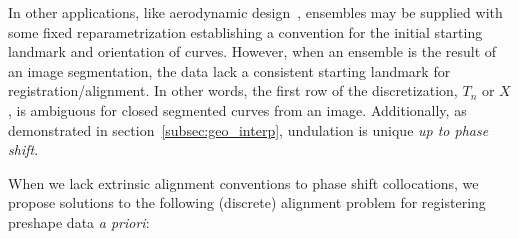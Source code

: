 \documentclass[pdflatex,iicol]{sn-jnl}%
\theoremstyle{thmstyleone}%
\theoremstyle{thmstyletwo}%
\theoremstyle{thmstylethree}%
\begin{document}
In other applications, like aerodynamic design~\cite{grey2023separable}, ensembles may be supplied with some fixed reparametrization establishing a convention for the initial starting landmark and orientation of curves. However, when an ensemble is the result of an image segmentation, the data lack a consistent starting landmark for registration/alignment. In other words, the first row of the discretization, $T_n$ or $X$, is ambiguous for closed segmented curves from an image. Additionally, as demonstrated in section~\ref{subsec:geo_interp}, undulation is unique \textit{up to phase shift}.

When we lack extrinsic alignment conventions to phase shift collocations, we propose solutions to the following (discrete) alignment problem for registering preshape data \textit{a priori}:
\end{document}
